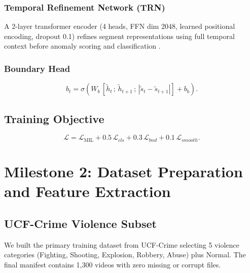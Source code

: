 \documentclass[11pt]{article}
\begin{document}
\subsubsection{Temporal Refinement Network (TRN)}
A 2-layer transformer encoder (4 heads, FFN dim 2048, learned positional encoding,
dropout 0.1) refines segment representations using full temporal context before
anomaly scoring and classification \citep{wu2023surveillance}.

\subsubsection{Boundary Head}
\begin{equation}
b_t = \sigma\!\left(
  W_b\,[\tilde{h}_t\,;\,\tilde{h}_{t+1}\,;\,|\tilde{s}_t - \tilde{s}_{t+1}|]
  + b_b
\right).
\end{equation}

\subsection{Training Objective}
\begin{equation}
\mathcal{L} = \mathcal{L}_\mathrm{MIL}
            + 0.5\,\mathcal{L}_{cls}
            + 0.3\,\mathcal{L}_{bnd}
            + 0.1\,\mathcal{L}_{smooth}.
\end{equation}

\section{Milestone 2: Dataset Preparation and Feature Extraction}

\subsection{UCF-Crime Violence Subset}

We built the primary training dataset from UCF-Crime \citep{sultani2018real}
selecting 5 violence categories (Fighting, Shooting, Explosion, Robbery, Abuse)
plus Normal.
The final manifest contains 1,300 videos with zero missing or corrupt files.
\end{document}
